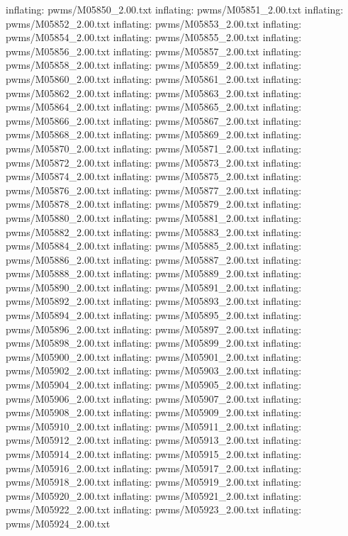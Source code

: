 \documentclass[letterpaper,10pt,english]{sphinxmanual}
\begin{document}
{\begin{sphinxVerbatim}[commandchars=\\\{\}]
  inflating: pwms/M05850\_2.00.txt
  inflating: pwms/M05851\_2.00.txt
  inflating: pwms/M05852\_2.00.txt
  inflating: pwms/M05853\_2.00.txt
  inflating: pwms/M05854\_2.00.txt
  inflating: pwms/M05855\_2.00.txt
  inflating: pwms/M05856\_2.00.txt
  inflating: pwms/M05857\_2.00.txt
  inflating: pwms/M05858\_2.00.txt
  inflating: pwms/M05859\_2.00.txt
  inflating: pwms/M05860\_2.00.txt
  inflating: pwms/M05861\_2.00.txt
  inflating: pwms/M05862\_2.00.txt
  inflating: pwms/M05863\_2.00.txt
  inflating: pwms/M05864\_2.00.txt
  inflating: pwms/M05865\_2.00.txt
  inflating: pwms/M05866\_2.00.txt
  inflating: pwms/M05867\_2.00.txt
  inflating: pwms/M05868\_2.00.txt
  inflating: pwms/M05869\_2.00.txt
  inflating: pwms/M05870\_2.00.txt
  inflating: pwms/M05871\_2.00.txt
  inflating: pwms/M05872\_2.00.txt
  inflating: pwms/M05873\_2.00.txt
  inflating: pwms/M05874\_2.00.txt
  inflating: pwms/M05875\_2.00.txt
  inflating: pwms/M05876\_2.00.txt
  inflating: pwms/M05877\_2.00.txt
  inflating: pwms/M05878\_2.00.txt
  inflating: pwms/M05879\_2.00.txt
  inflating: pwms/M05880\_2.00.txt
  inflating: pwms/M05881\_2.00.txt
  inflating: pwms/M05882\_2.00.txt
  inflating: pwms/M05883\_2.00.txt
  inflating: pwms/M05884\_2.00.txt
  inflating: pwms/M05885\_2.00.txt
  inflating: pwms/M05886\_2.00.txt
  inflating: pwms/M05887\_2.00.txt
  inflating: pwms/M05888\_2.00.txt
  inflating: pwms/M05889\_2.00.txt
  inflating: pwms/M05890\_2.00.txt
  inflating: pwms/M05891\_2.00.txt
  inflating: pwms/M05892\_2.00.txt
  inflating: pwms/M05893\_2.00.txt
  inflating: pwms/M05894\_2.00.txt
  inflating: pwms/M05895\_2.00.txt
  inflating: pwms/M05896\_2.00.txt
  inflating: pwms/M05897\_2.00.txt
  inflating: pwms/M05898\_2.00.txt
  inflating: pwms/M05899\_2.00.txt
  inflating: pwms/M05900\_2.00.txt
  inflating: pwms/M05901\_2.00.txt
  inflating: pwms/M05902\_2.00.txt
  inflating: pwms/M05903\_2.00.txt
  inflating: pwms/M05904\_2.00.txt
  inflating: pwms/M05905\_2.00.txt
  inflating: pwms/M05906\_2.00.txt
  inflating: pwms/M05907\_2.00.txt
  inflating: pwms/M05908\_2.00.txt
  inflating: pwms/M05909\_2.00.txt
  inflating: pwms/M05910\_2.00.txt
  inflating: pwms/M05911\_2.00.txt
  inflating: pwms/M05912\_2.00.txt
  inflating: pwms/M05913\_2.00.txt
  inflating: pwms/M05914\_2.00.txt
  inflating: pwms/M05915\_2.00.txt
  inflating: pwms/M05916\_2.00.txt
  inflating: pwms/M05917\_2.00.txt
  inflating: pwms/M05918\_2.00.txt
  inflating: pwms/M05919\_2.00.txt
  inflating: pwms/M05920\_2.00.txt
  inflating: pwms/M05921\_2.00.txt
  inflating: pwms/M05922\_2.00.txt
  inflating: pwms/M05923\_2.00.txt
  inflating: pwms/M05924\_2.00.txt

\end{sphinxVerbatim}}
\end{document}
